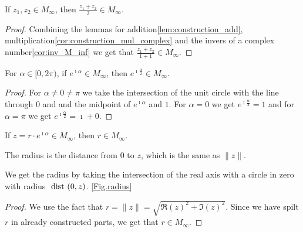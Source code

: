 \begin{corollary}
    \label{cor:Construction.midpoiont}
    \leanok
    If $z_1, z_2 \in M_{\infty}$, then $\frac{z_1 + z_2}{2} \in  M_{\infty}$.
    
\end{corollary}

\begin{proof}
    \leanok
    Combining the lemmas for addition\ref{lem:construction_add}, multiplication\ref{cor:construction_mul_complex} and the invers of a complex number\ref{cor:inv_M_inf} we get that $\frac{z_1 + z_2}{1+1} \in M_{\infty}$.
    
\end{proof}

\begin{lemma}
    \label{lem:Construction.angle_half_M_inf}
    \leanok
    For $\alpha \in [0,2\pi)$, if $e^{\imath\alpha} \in M_{\infty}$, then $e^{\imath\frac{\alpha}{2}} \in  M_{\infty}$.
\end{lemma}
\begin{proof}
    \leanok
    For $\alpha \ne 0 \ne \pi$ we take the intersection of the unit circle with the line through $0$ and and the midpoint of $e^{\imath\alpha}$ and $1$. 
    For $\alpha = 0$ we get $e^{\imath\frac{\alpha}{2}} = 1$ and for $\alpha = \pi$ we get $e^{\imath\frac{\alpha}{2}} =\imath + 0$.
\end{proof}

\begin{lemma}
    \label{lem:construction_radius}
    \leanok
    If $z = r\cdot e^{\imath\alpha} \in M_{\infty}$, then $r \in  M_{\infty}$.
\end{lemma}
\begin{remark}
    The radius is the distance from $0$ to $z$, which is the same as $\|z\|$.
\end{remark}
We get the radius by taking the intersection of the real axis with a circle in zero with radius $\text{ dist } (0,z)$. \ref{Fig.radius}
\begin{proof}
    \leanok
    We use the fact that $r = \|z\| = \sqrt{\Re(z)^2 + \Im(z)^2}$. Since we have spilt $r$ in already constructed parts, we get that $r \in M_{\infty}$.
\end{proof}

